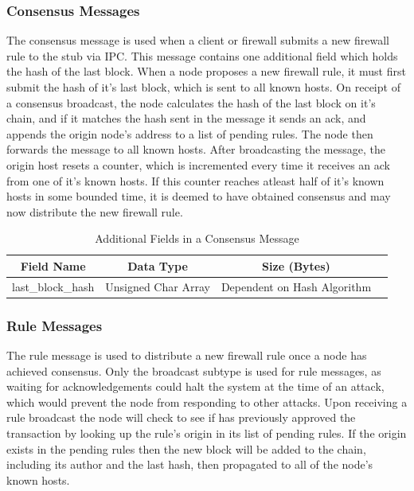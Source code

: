 \documentclass[a4paper, 11pt]{report}
\begin{document}
\subsubsection{Consensus Messages}
The consensus message is used when a client or firewall submits a new firewall rule to the \gls{stub} via \acrshort{IPC}. This message contains one additional field which holds the hash of the last block. When a node proposes a new firewall rule, it must first submit the hash of it's last block, which is sent to all known hosts. On receipt of a consensus broadcast, the node calculates the hash of the last block on it's chain, and if it matches the hash sent in the message it sends an ack, and appends the origin node's address to a list of pending rules. The node then forwards the message to all known hosts. After broadcasting the message, the origin host resets a counter, which is incremented every time it receives an ack from one of it's known hosts. If this counter reaches atleast half of it's known hosts in some bounded time, it is deemed to have obtained consensus and may now distribute the new firewall rule.

\begin{table}[H]
\centering
\begin{tabular}{ |c|c|c|c| } 
\hline
Field Name & Data Type & Size (Bytes) \\
\hline
last_block_hash & Unsigned Char Array & Dependent on Hash Algorithm \\ 
\hline
\end{tabular}
\caption{Additional Fields in a Consensus Message}
\label{tab:consensus}
\end{table}

\subsubsection{Rule Messages}
The rule message is used to distribute a new firewall rule once a node has achieved consensus. Only the broadcast subtype is used for rule messages, as waiting for acknowledgements could halt the system at the time of an attack, which would prevent the node from responding to other attacks. Upon receiving a rule broadcast the node will check to see if has previously approved the transaction by looking up the rule's origin in its list of pending rules. If the origin exists in the pending rules then the new block will be added to the chain, including its author and the last hash, then propagated to all of the node's known hosts.
\end{document}
